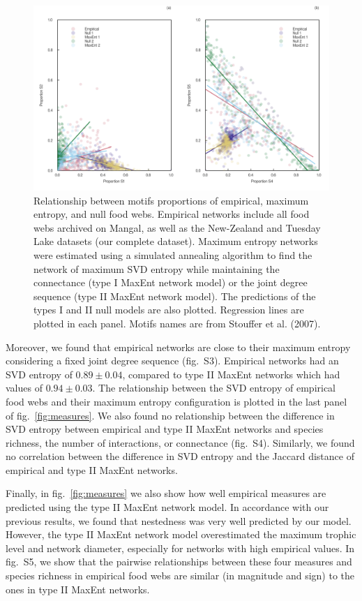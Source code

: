 \documentclass[10pt,oneside]{article}
\makeatletter
\def\maxwidth{\ifdim\Gin@nat@width>\linewidth\linewidth
\else\Gin@nat@width\fi}
\let\Oldincludegraphics\includegraphics
\renewcommand{\includegraphics}[1]{\Oldincludegraphics[width=\maxwidth]{#1}}
\makeatother
\begin{document}
\begin{figure}
\hypertarget{fig:motifs_rel}{%
\centering
\includegraphics{figures/motifs_relations.png}
\caption{Relationship between motifs proportions of empirical, maximum
entropy, and null food webs. Empirical networks include all food webs
archived on Mangal, as well as the New-Zealand and Tuesday Lake datasets
(our complete dataset). Maximum entropy networks were estimated using a
simulated annealing algorithm to find the network of maximum SVD entropy
while maintaining the connectance (type I MaxEnt network model) or the
joint degree sequence (type II MaxEnt network model). The predictions of
the types I and II null models are also plotted. Regression lines are
plotted in each panel. Motifs names are from Stouffer et al.
(2007).}\label{fig:motifs_rel}
}
\end{figure}

Moreover, we found that empirical networks are close to their maximum
entropy considering a fixed joint degree sequence (fig.~S3). Empirical
networks had an SVD entropy of \(0.89 \pm 0.04\), compared to type II
MaxEnt networks which had values of \(0.94 \pm 0.03\). The relationship
between the SVD entropy of empirical food webs and their maximum entropy
configuration is plotted in the last panel of fig.~\ref{fig:measures}.
We also found no relationship between the difference in SVD entropy
between empirical and type II MaxEnt networks and species richness, the
number of interactions, or connectance (fig.~S4). Similarly, we found no
correlation between the difference in SVD entropy and the Jaccard
distance of empirical and type II MaxEnt networks.

Finally, in fig.~\ref{fig:measures} we also show how well empirical
measures are predicted using the type II MaxEnt network model. In
accordance with our previous results, we found that nestedness was very
well predicted by our model. However, the type II MaxEnt network model
overestimated the maximum trophic level and network diameter, especially
for networks with high empirical values. In fig.~S5, we show that the
pairwise relationships between these four measures and species richness
in empirical food webs are similar (in magnitude and sign) to the ones
in type II MaxEnt networks.
\end{document}
